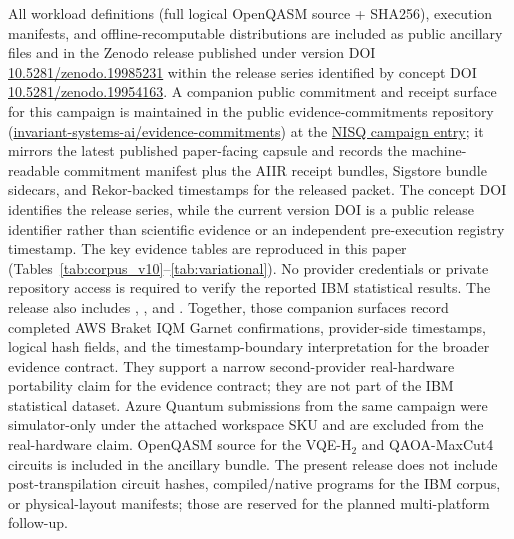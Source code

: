 \documentclass[aps,prxquantum,twocolumn,superscriptaddress,amsmath,amssymb,longbibliography,floatfix]{revtex4-2}
\begin{document}
All workload definitions (full logical OpenQASM source + SHA256), execution manifests, and offline-recomputable distributions are included as public ancillary files and in the Zenodo release published under version DOI \href{https://doi.org/10.5281/zenodo.19985231}{10.5281/zenodo.19985231} within the release series identified by concept DOI \href{https://doi.org/10.5281/zenodo.19954163}{10.5281/zenodo.19954163}. A companion public commitment and receipt surface for this campaign is maintained in the public evidence-commitments repository (\href{https://github.com/invariant-systems-ai/evidence-commitments}{invariant-systems-ai/evidence-commitments}) at the \href{https://github.com/invariant-systems-ai/evidence-commitments/tree/main/commitments/nisq-readiness-2026-05-02}{NISQ campaign entry}; it mirrors the latest published paper-facing capsule and records the machine-readable commitment manifest plus the AIIR receipt bundles, Sigstore bundle sidecars, and Rekor-backed timestamps for the released packet. The concept DOI identifies the release series, while the current version DOI is a public release identifier rather than scientific evidence or an independent pre-execution registry timestamp. The key evidence tables are reproduced in this paper (Tables~\ref{tab:corpus_v10}--\ref{tab:variational}). No provider credentials or private repository access is required to verify the reported IBM statistical results. The release also includes , , and . Together, those companion surfaces record completed AWS Braket IQM Garnet confirmations, provider-side timestamps, logical hash fields, and the timestamp-boundary interpretation for the broader evidence contract. They support a narrow second-provider real-hardware portability claim for the evidence contract; they are not part of the IBM statistical dataset. Azure Quantum submissions from the same campaign were simulator-only under the attached workspace SKU and are excluded from the real-hardware claim. OpenQASM source for the VQE-H$_2$ and QAOA-MaxCut4 circuits is included in the ancillary bundle. The present release does not include post-transpilation circuit hashes, compiled/native programs for the IBM corpus, or physical-layout manifests; those are reserved for the planned multi-platform follow-up.
\end{document}
